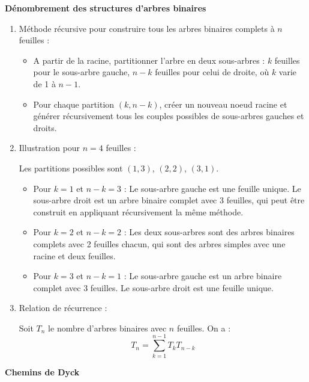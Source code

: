 \documentclass[10pt,a4paper]{article}
\begin{document}
\q \textbf{Dénombrement des structures d'arbres binaires}

\begin{enumerate}
    \item Méthode récursive pour construire tous les arbres binaires complets à \( n \) feuilles :
    \begin{itemize}
         \item A partir de la racine, partitionner l'arbre en deux sous-arbres : \( k \) feuilles
         pour le sous-arbre gauche, \( n - k \) feuilles pour celui de droite, où \( k \) varie de 1
         à \( n - 1 \).
         \item Pour chaque partition \( (k, n - k) \), créer un nouveau noeud racine et générer
         récursivement tous les couples possibles de sous-arbres gauches et droits.
    \end{itemize}

    \item Illustration pour \( n = 4 \) feuilles :

    Les partitions possibles sont  \( (1, 3) \), \( (2, 2) \), \( (3, 1) \).
    \begin{itemize}
         \item Pour \( k = 1 \) et \( n - k = 3 \) : Le sous-arbre gauche est une feuille unique. Le
      sous-arbre droit est un arbre binaire complet avec 3 feuilles, qui peut être construit en
      appliquant récursivement la même méthode.
      \item  Pour \( k = 2 \) et \( n - k = 2 \) : Les deux
      sous-arbres sont des arbres binaires complets avec 2 feuilles chacun, qui sont des arbres simples
      avec une racine et deux feuilles.
      \item Pour \( k = 3 \) et \( n - k = 1 \) : Le sous-arbre gauche
      est un arbre binaire complet avec 3 feuilles. Le sous-arbre droit est une feuille unique.
    \end{itemize}

    

    \item Relation de récurrence :

    Soit \(T_n\) le nombre d'arbres binaires avec \(n\) feuilles. On a :
    \[ T_n = \sum_{k=1}^{n-1} T_k T_{n-k} \]
\end{enumerate}

\q \textbf{Chemins de Dyck}
\end{document}
